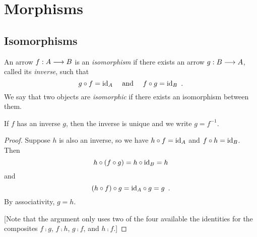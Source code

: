
\chapter{Morphisms}

\section{Isomorphisms}
\begin{definition}[Isomorphism]
An arrow $f : A \longrightarrow B$ is an \emph{isomorphism} if there exists an
arrow $g : B \longrightarrow A$, called its \emph{inverse}, such that
\[
    g \circ f = \mathrm{id}_{ A } \quad \text{ and } \quad f \circ g = \mathrm{id}_{ B }
    \enspace.
\]
We say that two objects are \emph{isomorphic} if there exists an isomorphism
between them.
\end{definition}

\begin{remark}
If $f$ has an inverse $g$, then the inverse is unique and we write $g = f^{-1}$.
\end{remark}

\begin{proof}
Suppose $h$ is also an inverse, so we have
$h \circ f = \mathrm{id}_{ A }$ and $f \circ h = \mathrm{id}_{ B }$.
Then
\[
    h \circ (f \circ g) = h \circ \mathrm{id}_{ B } = h
\]
and
\[
(h \circ f) \circ g = \mathrm{id}_{ A } \circ g = g
\enspace.
\]
By associativity, $g = h$.

[Note that the argument only uses two of the four available the identities for
the composites $f\comp g$, $f\comp h$, $g\comp f$, and $h\comp f$.]
\end{proof}

